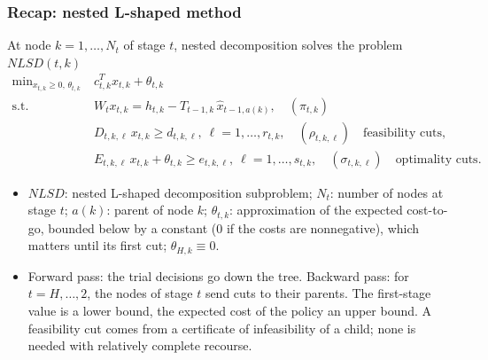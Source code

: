 \documentclass[aspectratio=169]{beamer}
\begin{document}
\begin{frame}
\frametitle{Recap: nested L-shaped method}

At node $k = 1, \ldots, N_t$ of stage $t$, nested decomposition solves the problem $NLSD(t,k)$
\begin{align*}
\min\nolimits_{x_{t,k} \geq 0,\, \theta_{t,k}}\ & c_{t,k}^T x_{t,k} + \theta_{t,k} \\
\mbox{s.t. }\ & W_t x_{t,k} = h_{t,k} - T_{t-1,k}\, \hat{x}_{t-1,a(k)}, \quad (\pi_{t,k}) \\
& D_{t,k,\ell}\, x_{t,k} \geq d_{t,k,\ell},\ \ell = 1, \ldots, r_{t,k}, \quad (\rho_{t,k,\ell}) \quad \text{feasibility cuts}, \\
& E_{t,k,\ell}\, x_{t,k} + \theta_{t,k} \geq e_{t,k,\ell},\ \ell = 1, \ldots, s_{t,k}, \quad (\sigma_{t,k,\ell}) \quad \text{optimality cuts}.
\end{align*}
\begin{small}
\begin{itemize}
\item
$NLSD$: nested L-shaped decomposition subproblem; $N_t$: number of nodes at stage $t$; $a(k)$:
parent of node $k$; $\theta_{t,k}$: approximation of the expected cost-to-go, bounded below by a constant
($0$ if the costs are nonnegative), which matters until its first cut; $\theta_{H,k} \equiv 0$.
\item
Forward pass: the trial decisions go down the tree. Backward pass: for $t = H, \ldots, 2$, the
nodes of stage $t$ send cuts to their parents. The first-stage value is a lower bound, the expected
cost of the policy an upper bound. A feasibility cut comes from a certificate of infeasibility of
a child; none is needed with relatively complete recourse.
\end{itemize}
\end{small}

\end{frame}
\end{document}
